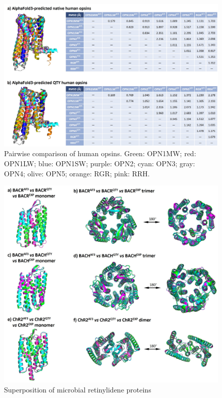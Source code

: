 \documentclass[fleqn,10pt,lineno]{manuscript}
\begin{document}
\begin{figure}[htbp]
	\centering
	\includegraphics[width=\linewidth]{Figures/pairwise.jpg}
	\caption{Pairwise comparison of human opsins. Green: OPN1MW; red: OPN1LW; blue: OPN1SW; purple: OPN2; cyan: OPN3; gray: OPN4; olive: OPN5; orange: RGR; pink: RRH. }
	\label{fig:pairwise}
\end{figure}

\begin{figure}[htbp]
	\centering
	\includegraphics[width=\linewidth]{Figures/superposition-microbial.jpg}
	\caption{Superposition of microbial retinylidene proteins}
	\label{fig:microbialsup}
\end{figure}
\end{document}

